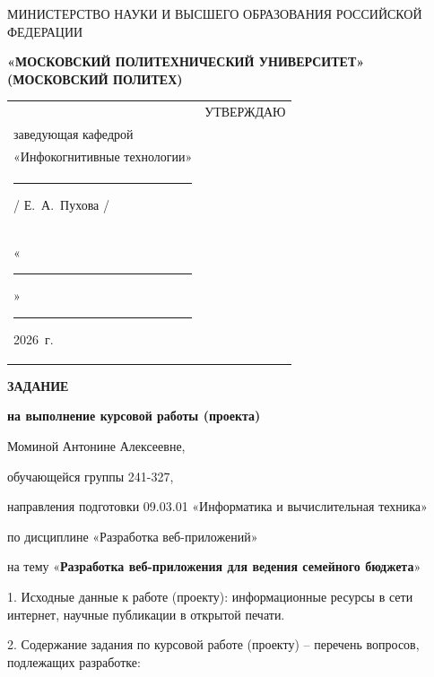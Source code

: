 \documentclass[14pt, a4paper]{extarticle}
\begin{document}
\pagestyle{empty}


\begin{center}
    {\small МИНИСТЕРСТВО НАУКИ И ВЫСШЕГО ОБРАЗОВАНИЯ РОССИЙСКОЙ ФЕДЕРАЦИИ}


    {\small \textbf{«МОСКОВСКИЙ ПОЛИТЕХНИЧЕСКИЙ УНИВЕРСИТЕТ»}} \\
    {\small \textbf{(МОСКОВСКИЙ ПОЛИТЕХ)}}
\end{center}

\begin{tabularx}{\textwidth}{@{} p{} p{} @{}}
     &
    \raggedright
    УТВЕРЖДАЮ                          \\
    заведующая кафедрой                \\
    «Инфокогнитивные технологии»       \\[0.3cm]

    \rule{3cm}{0.4pt} / Е.~А.~Пухова / \\[0.1cm]

    «\rule{0.8cm}{0.4pt}» \rule{3cm}{0.4pt} 2026~г.
\end{tabularx}


\begin{center}

    { \large \textbf{ЗАДАНИЕ}}

    \textbf{на выполнение курсовой работы (проекта)}

    Моминой Антонине Алексеевне,

\end{center}

обучающейся группы 241-327,

направления подготовки 09.03.01 «Информатика и вычислительная техника»

по дисциплине «Разработка веб-приложений»

на тему «\textbf{Разработка веб-приложения для ведения семейного бюджета}»

1. Исходные данные к работе (проекту): информационные ресурсы в сети
интернет, научные публикации в открытой печати.

2. Содержание задания по курсовой работе (проекту) -- перечень вопросов,
подлежащих разработке:
\end{document}
